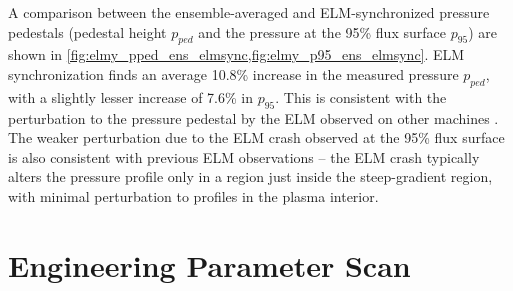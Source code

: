 \begin{figure}[h]
 \pushtooutside
\end{figure}

A comparison between the ensemble-averaged and ELM-synchronized pressure pedestals (pedestal height $p_{ped}$ and the pressure at the 95\% flux surface $p_{95}$) are shown in \cref{fig:elmy_pped_ens_elmsync,fig:elmy_p95_ens_elmsync}.  ELM synchronization finds an average 10.8\% increase in the measured pressure $p_{ped}$, with a slightly lesser increase of 7.6\% in $p_{95}$.  This is consistent with the perturbation to the pressure pedestal by the ELM observed on other machines \cite{Urano2003,Loarte2003}.  The weaker perturbation due to the ELM crash observed at the 95\% flux surface is also consistent with previous ELM observations -- the ELM crash typically alters the pressure profile only in a region just inside the steep-gradient region, with minimal perturbation to profiles in the plasma interior.\nicesectionending

\section{Engineering Parameter Scan}\label{sec:elmy_engineer}

